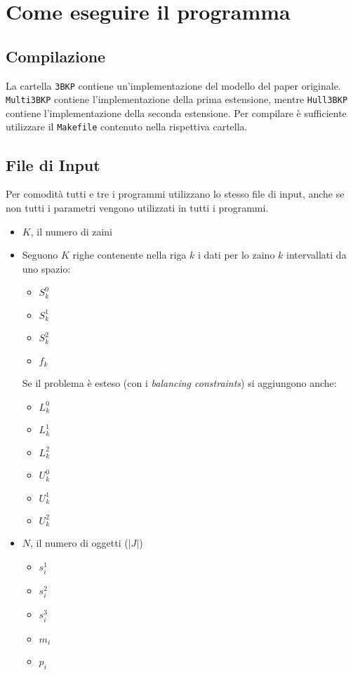 \section{Come eseguire il programma}
\subsection{Compilazione}
La cartella \verb|3BKP| contiene un'implementazione del modello del paper originale.
\verb|Multi3BKP| contiene l'implementazione della prima estensione, 
mentre \verb|Hull3BKP| contiene l'implementazione della seconda estensione.
Per compilare è sufficiente utilizzare il \verb|Makefile| contenuto nella 
rispettiva cartella.


\subsection{File di Input}
Per comodità tutti e tre i programmi utilizzano lo stesso file di input, anche se 
non tutti i parametri vengono utilizzati in tutti i programmi.
\begin{itemize}
	\item $K$, il numero di zaini
	\item Seguono $K$ righe contenente nella riga $k$ i dati per lo zaino $k$ 
	intervallati da uno spazio:
	\begin{itemize}
		\item $S_k^0$
		\item $S_k^1$
		\item $S_k^2$
		\item $f_k$
	\end{itemize} 
	Se il problema è esteso (con i \emph{balancing constraints}) si 
	aggiungono anche:
	\begin{itemize}
		\item $L_k^0$
		\item $L_k^1$
		\item $L_k^2$
		\item $U_k^0$
		\item $U_k^1$
		\item $U_k^2$
	\end{itemize}
	\item $N$, il numero di oggetti ($|J|$)
	\begin{itemize}
		\item $s_i^1$
		\item $s_i^2$
		\item $s_i^3$
		\item $m_i$
		\item $p_i$
	\end{itemize}
\end{itemize}

